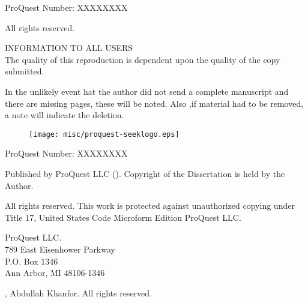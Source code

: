\documentclass[12pt]{report}
\newcommand{\thesisname}{Abdullah Khanfor}
\newcommand{\graddate}{\the\year} %
\begin{document}
\newpage



\thispagestyle{empty}
\begin{center}
ProQuest Number: XXXXXXXX

\vspace{.45in}

All rights reserved.

\vspace{.1in}

INFORMATION TO ALL USERS\\
The quality of this reproduction is dependent upon the quality of the copy submitted.
\vspace{.2in}

In the unlikely event hat  the author did not send a complete manuscript and there are missing pages, these will be  noted. Also ,if material had to be removed, a note will indicate the deletion.

\vspace{.1in}

\begin{figure}[H]
  \centering
  \texttt{[image: misc/proquest-seeklogo.eps]}
\end{figure}

\vspace{.1in}

ProQuest Number: XXXXXXXX

\vspace{.1in}

Published  by  ProQuest  LLC (\the\year).        Copyright of the Dissertation is held by the Author.

\vspace{.2in}

All rights reserved. This work is protected against  unauthorized copying under Title 17, United States Code Microform Edition {\textcopyright} ProQuest  LLC.

\vspace{.2in}

ProQuest LLC.\\
789 East Eisenhower Parkway\\
P.O. Box 1346\\
Ann Arbor, MI  48106-1346

\end{center}
\newpage

%
\setcounter{page}{2}
\thispagestyle{empty}
%
\begin{center}
{
  \vspace*{\fill}

  {\textcopyright} \graddate, \thesisname. All rights reserved.
}

\end{center}
\end{document}
